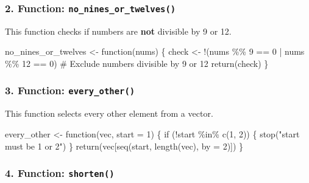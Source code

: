 \documentclass[
  letterpaper,
  DIV=11,
  numbers=noendperiod]{scrartcl}
\newenvironment{Shaded}{\begin{snugshade}}{\end{snugshade}}
\newcommand{\AttributeTok}[1]{\textcolor[rgb]{0.40,0.45,0.13}{#1}}
\newcommand{\CommentTok}[1]{\textcolor[rgb]{0.37,0.37,0.37}{#1}}
\newcommand{\ControlFlowTok}[1]{\textcolor[rgb]{0.00,0.23,0.31}{#1}}
\newcommand{\DecValTok}[1]{\textcolor[rgb]{0.68,0.00,0.00}{#1}}
\newcommand{\FunctionTok}[1]{\textcolor[rgb]{0.28,0.35,0.67}{#1}}
\newcommand{\NormalTok}[1]{\textcolor[rgb]{0.00,0.23,0.31}{#1}}
\newcommand{\OtherTok}[1]{\textcolor[rgb]{0.00,0.23,0.31}{#1}}
\newcommand{\SpecialCharTok}[1]{\textcolor[rgb]{0.37,0.37,0.37}{#1}}
\newcommand{\StringTok}[1]{\textcolor[rgb]{0.13,0.47,0.30}{#1}}
\begin{document}
\subsubsection{\texorpdfstring{2. Function:
\texttt{no\_nines\_or\_twelves()}}{2. Function: no\_nines\_or\_twelves()}}\label{function-no_nines_or_twelves}

This function checks if numbers are \textbf{not} divisible by 9 or 12.

\begin{Shaded}
\begin{Highlighting}[]
\NormalTok{no\_nines\_or\_twelves }\OtherTok{\textless{}{-}} \ControlFlowTok{function}\NormalTok{(nums) \{}
\NormalTok{  check }\OtherTok{\textless{}{-}} \SpecialCharTok{!}\NormalTok{(nums }\SpecialCharTok{\%\%} \DecValTok{9} \SpecialCharTok{==} \DecValTok{0} \SpecialCharTok{|}\NormalTok{ nums }\SpecialCharTok{\%\%} \DecValTok{12} \SpecialCharTok{==} \DecValTok{0}\NormalTok{)  }\CommentTok{\# Exclude numbers divisible by 9 or 12}
  \FunctionTok{return}\NormalTok{(check)}
\NormalTok{\}}
\end{Highlighting}
\end{Shaded}

\subsubsection{\texorpdfstring{3. Function:
\texttt{every\_other()}}{3. Function: every\_other()}}\label{function-every_other}

This function selects every other element from a vector.

\begin{Shaded}
\begin{Highlighting}[]
\NormalTok{every\_other }\OtherTok{\textless{}{-}} \ControlFlowTok{function}\NormalTok{(vec, }\AttributeTok{start =} \DecValTok{1}\NormalTok{) \{}
  \ControlFlowTok{if}\NormalTok{ (}\SpecialCharTok{!}\NormalTok{start }\SpecialCharTok{\%in\%} \FunctionTok{c}\NormalTok{(}\DecValTok{1}\NormalTok{, }\DecValTok{2}\NormalTok{)) \{}
    \FunctionTok{stop}\NormalTok{(}\StringTok{"start must be 1 or 2"}\NormalTok{)}
\NormalTok{  \}}
  \FunctionTok{return}\NormalTok{(vec[}\FunctionTok{seq}\NormalTok{(start, }\FunctionTok{length}\NormalTok{(vec), }\AttributeTok{by =} \DecValTok{2}\NormalTok{)])}
\NormalTok{\}}
\end{Highlighting}
\end{Shaded}

\subsubsection{\texorpdfstring{4. Function:
\texttt{shorten()}}{4. Function: shorten()}}\label{function-shorten}
\end{document}

